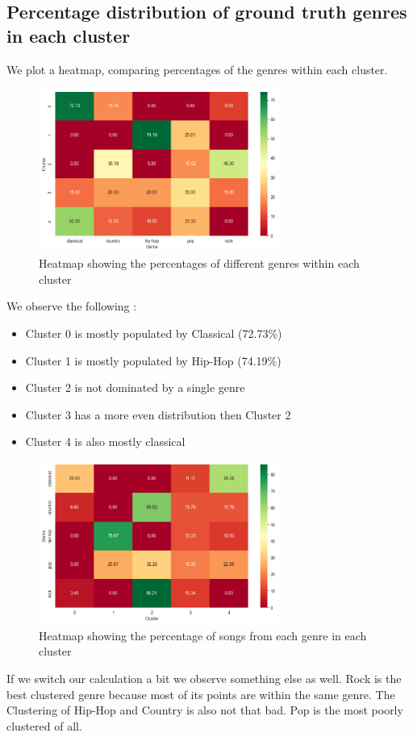 \documentclass{article}
\begin{document}
\subsection{Percentage distribution of ground truth genres in each cluster}
We plot a heatmap, comparing percentages of the genres within each cluster.
\begin{figure}[h]
    \centering
    \includegraphics[width=0.7\textwidth]{heatmap.png} %
    \caption{Heatmap showing the percentages of different genres within each cluster}
    \label{fig:distribution}
\end{figure}
We observe the following :
\begin{itemize}
\item Cluster 0 is mostly populated by Classical (72.73\%)
\item Cluster 1 is mostly populated by Hip-Hop (74.19\%)
\item Cluster 2 is not dominated by a single genre
\item Cluster 3 has a more even distribution then Cluster 2
\item Cluster 4 is also mostly classical
\end{itemize}
\pagebreak
\begin{figure}[h]
    \centering
    \includegraphics[width=0.7\textwidth]{heatmap2.png} %
    \caption{Heatmap showing the percentage of songs from each genre in each cluster}
    \label{fig:distributionreverse}
\end{figure}
If we switch our calculation a bit we observe something else as well. Rock is the best clustered genre because most of its points are within the same genre. The Clustering of Hip-Hop and Country is also not that bad. Pop is the most poorly clustered of all.
\end{document}

